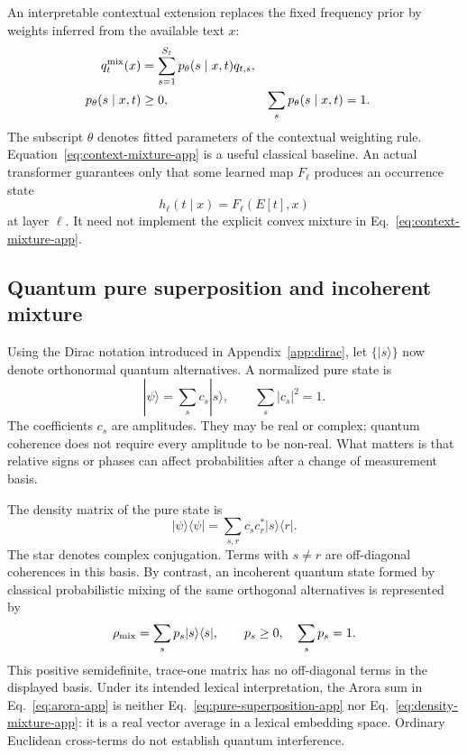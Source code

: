 \documentclass[
  aps,
  reprint,
  superscriptaddress,
  floatfix,
  nofootinbib,
  longbibliography
]{revtex4-2}
\begin{document}
An interpretable contextual extension replaces the fixed frequency prior by
weights inferred from the available text $x$:
\begin{equation}
\begin{aligned}
 q_t^{\rm mix}(x)
 &=\sum_{s=1}^{S_t}p_\theta(s\mid x,t)q_{t,s},\\
 p_\theta(s\mid x,t)&\geq0,
 &\sum_s p_\theta(s\mid x,t)&=1.
\end{aligned}
 \label{eq:context-mixture-app}
\end{equation}
The subscript $\theta$ denotes fitted parameters of the contextual weighting
rule.  Equation~\eqref{eq:context-mixture-app} is a useful classical baseline.
An actual transformer guarantees only that some learned map $F_\ell$ produces
an occurrence state
\begin{equation}
 h_\ell(t\mid x)=F_\ell(E[t],x)
 \label{eq:context-state-app}
\end{equation}
at layer $\ell$.  It need not implement the explicit convex mixture in
Eq.~\eqref{eq:context-mixture-app}.

\subsection{Quantum pure superposition and incoherent mixture}

Using the Dirac notation introduced in Appendix~\ref{app:dirac}, let
$\{|s\rangle\}$ now denote orthonormal quantum alternatives.  A normalized
pure state is
\begin{equation}
 |\psi\rangle=\sum_s c_s|s\rangle,
 \qquad
 \sum_s|c_s|^2=1.
 \label{eq:pure-superposition-app}
\end{equation}
The coefficients $c_s$ are amplitudes.  They may be real or complex; quantum
coherence does not require every amplitude to be non-real.  What matters is
that relative signs or phases can affect probabilities after a change of
measurement basis.

The density matrix of the pure state is
\begin{equation}
 |\psi\rangle\langle\psi|
 =\sum_{s,r}c_s c_r^*|s\rangle\langle r|.
 \label{eq:pure-density-app}
\end{equation}
The star denotes complex conjugation.  Terms with $s\ne r$ are off-diagonal
coherences in this basis.  By contrast, an incoherent quantum state formed by
classical probabilistic mixing of the same orthogonal alternatives is
represented by
\begin{equation}
 \rho_{\rm mix}=\sum_s p_s|s\rangle\langle s|,
 \qquad p_s\geq0,\quad\sum_s p_s=1.
 \label{eq:density-mixture-app}
\end{equation}
This positive semidefinite, trace-one matrix has no off-diagonal terms in the
displayed basis.  Under its intended lexical interpretation, the Arora sum in
Eq.~\eqref{eq:arora-app} is neither
Eq.~\eqref{eq:pure-superposition-app} nor
Eq.~\eqref{eq:density-mixture-app}: it is a real vector average in a lexical
embedding space.  Ordinary Euclidean cross-terms do not establish quantum
interference.
\end{document}
